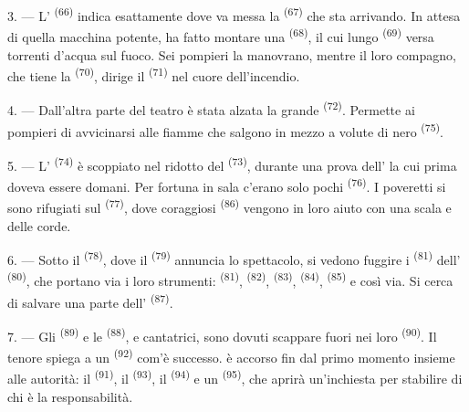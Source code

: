 3. --- L' \textsuperscript{(66)} indica esattamente dove va messa la
 \textsuperscript{(67)} che sta arrivando. In attesa di quella
macchina potente, ha fatto montare una  \textsuperscript{(68)}, il
cui lungo  \textsuperscript{(69)} versa torrenti d'acqua sul fuoco. Sei
pompieri la manovrano, mentre il loro compagno, che tiene la 
\textsuperscript{(70)}, dirige il  \textsuperscript{(71)} nel cuore
dell'incendio.

4. --- Dall'altra parte del teatro è stata alzata la grande 
\textsuperscript{(72)}. Permette ai pompieri di avvicinarsi alle fiamme che salgono in
mezzo a volute di  nero \textsuperscript{(75)}.

\VUsaut{5.0mm}
\VUsaut{3.4mm}

5. --- L' \textsuperscript{(74)} è scoppiato nel ridotto del
 \textsuperscript{(73)}, durante una prova dell' la cui
prima  doveva essere domani. Per fortuna in sala c'erano solo
pochi  \textsuperscript{(76)}. I poveretti si sono rifugiati sul
 \textsuperscript{(77)}, dove coraggiosi 
\textsuperscript{(86)} vengono in loro aiuto con una scala e delle corde.

6. --- Sotto il  \textsuperscript{(78)}, dove il 
\textsuperscript{(79)} annuncia lo spettacolo, si vedono fuggire i 
\textsuperscript{(81)} dell' \textsuperscript{(80)}, che portano via
i loro strumenti:  \textsuperscript{(81)}, 
\textsuperscript{(82)},  \textsuperscript{(83)},
 \textsuperscript{(84)},  \textsuperscript{(85)} e
così via. Si cerca di salvare una parte dell'
\textsuperscript{(87)}.

7. --- Gli  \textsuperscript{(89)} e le 
\textsuperscript{(88)},  e cantatrici, sono dovuti scappare fuori nei
loro  \textsuperscript{(90)}. Il tenore spiega a un
 \textsuperscript{(92)} com'è successo.  è
accorso fin dal primo momento insieme alle autorità: il 
\textsuperscript{(91)}, il  \textsuperscript{(93)}, il
 \textsuperscript{(94)} e un 
\textsuperscript{(95)}, che aprirà un'inchiesta per stabilire di chi è la
responsabilità.
\VUsaut{6.0mm}
\VUfilet{22mm}
